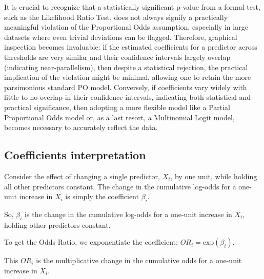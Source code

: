 \documentclass[
  letterpaper,
  DIV=11,
  numbers=noendperiod]{scrartcl}
\begin{document}
\begin{tcolorbox}[enhanced jigsaw, opacitybacktitle=0.6, toptitle=1mm, title=\textcolor{quarto-callout-note-color}{\faInfo}\hspace{0.5em}{Note}, coltitle=black, colframe=quarto-callout-note-color-frame, titlerule=0mm, breakable, left=2mm, bottomtitle=1mm, arc=.35mm, colback=white, rightrule=.15mm, colbacktitle=quarto-callout-note-color!10!white, toprule=.15mm, opacityback=0, leftrule=.75mm, bottomrule=.15mm]

It is crucial to recognize that a statistically significant p-value from
a formal test, such as the Likelihood Ratio Test, does not always
signify a practically meaningful violation of the Proportional Odds
assumption, especially in large datasets where even trivial deviations
can be flagged. Therefore, graphical inspection becomes invaluable: if
the estimated coefficients for a predictor across thresholds are very
similar and their confidence intervals largely overlap (indicating
near-parallelism), then despite a statistical rejection, the practical
implication of the violation might be minimal, allowing one to retain
the more parsimonious standard PO model. Conversely, if coefficients
vary widely with little to no overlap in their confidence intervals,
indicating both statistical and practical significance, then adopting a
more flexible model like a Partial Proportional Odds model or, as a last
resort, a Multinomial Logit model, becomes necessary to accurately
reflect the data.

\end{tcolorbox}

\hypertarget{coefficients-interpretation}{%
\subsection{Coefficients
interpretation}\label{coefficients-interpretation}}

Consider the effect of changing a single predictor, \(X_i\), by one
unit, while holding all other predictors constant. The change in the
cumulative log-odds for a one-unit increase in \(X_i\) is simply the
coefficient \(\beta_i\).

So, \(\beta_i\) is the change in the cumulative log-odds for a one-unit
increase in \(X_i\), holding other predictors constant.

To get the Odds Ratio, we exponentiate the coefficient:
\(OR_i = \text{exp}(\beta_i)\).

This \(OR_i\) is the multiplicative change in the cumulative odds for a
one-unit increase in \(X_i\).
\end{document}
